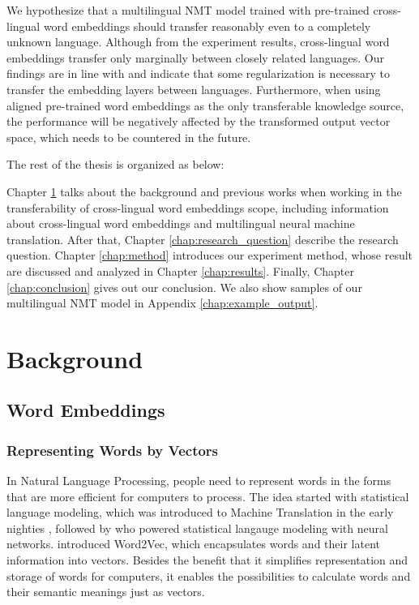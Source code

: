 \documentclass[thesis,fonts=libertine]{cluu}
\begin{document}
We hypothesize that a multilingual NMT model trained with pre-trained cross-lingual word embeddings should transfer reasonably even to a completely unknown language. Although from the experiment results, cross-lingual word embeddings transfer only marginally between closely related languages. Our findings are in line with \textcite{aji-etal-2020-neural} and indicate that some regularization is necessary to transfer the embedding layers between languages. Furthermore, when using aligned pre-trained word embeddings as the only transferable knowledge source, the performance will be negatively affected by the transformed output vector space, which needs to be countered in the future.

The rest of the thesis is organized as below:

Chapter \ref{chap:background} talks about the background and previous works when working in the transferability of cross-lingual word embeddings scope, including information about cross-lingual word embeddings and multilingual neural machine translation. After that, Chapter \ref{chap:research_question} describe the research question. Chapter \ref{chap:method} introduces our experiment method, whose result are discussed and analyzed in Chapter \ref{chap:results}. Finally, Chapter \ref{chap:conclusion} gives out our conclusion. We also show samples of our multilingual NMT model in Appendix \ref{chap:example_output}.

\chapter{Background}
\label{chap:background}

\section{Word Embeddings}
\subsection{Representing Words by Vectors}

In Natural Language Processing, people need to represent words in the forms that are more efficient for computers to process. The idea started with statistical language modeling, which was introduced to Machine Translation in the early nighties \parencite{brown-etal-1990-statistical}, followed by \textcite{bengio2003neural} who powered statistical langauge modeling with neural networks. \textcite{Mikolov:2013aa} introduced Word2Vec, which encapsulates words and their latent information into vectors. Besides the benefit that it simplifies representation and storage of words for computers, it enables the possibilities to calculate words and their semantic meanings just as vectors.
\end{document}
